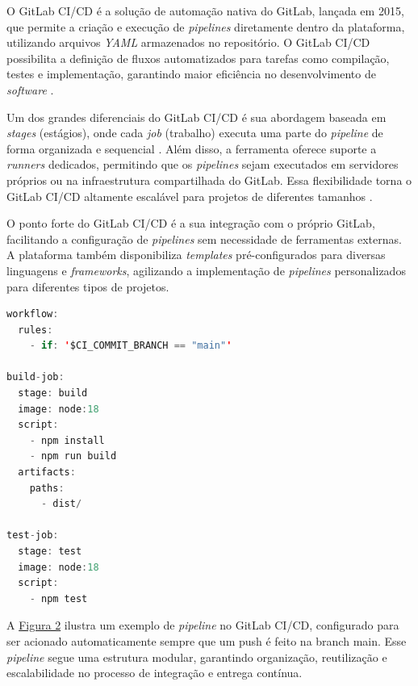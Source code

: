 O GitLab CI/CD é a solução de automação nativa do GitLab, lançada em 2015, que permite a criação e execução de \textit{pipelines} diretamente dentro da plataforma, utilizando arquivos \textit{YAML} armazenados no repositório. O GitLab CI/CD possibilita a definição de fluxos automatizados para tarefas como compilação, testes e implementação, garantindo maior eficiência no desenvolvimento de \textit{software} \cite{GetStartedWithGitLab}.

Um dos grandes diferenciais do GitLab CI/CD é sua abordagem baseada em \textit{stages} (estágios), onde cada \textit{job} (trabalho) executa uma parte do \textit{pipeline} de forma organizada e sequencial \cite{GitlabSteps}. Além disso, a ferramenta oferece suporte a \textit{runners} dedicados, permitindo que os \textit{pipelines} sejam executados em servidores próprios ou na infraestrutura compartilhada do GitLab. Essa flexibilidade torna o GitLab CI/CD altamente escalável para projetos de diferentes tamanhos \cite{GitlabRunners}. 

O ponto forte do GitLab CI/CD é a sua integração com o próprio GitLab, facilitando a configuração de \textit{pipelines} sem necessidade de ferramentas externas. A plataforma também disponibiliza \textit{templates} pré-configurados para diversas linguagens e \textit{frameworks}, agilizando a implementação de \textit{pipelines} personalizados para diferentes tipos de projetos.

\begin{sourcecode}[H]
\caption{\label{codigo:codigoGitlab}Exemplo arquivo de configuração de \textit{pipeline} do GitLab}
\begin{lstlisting}[frame=single, language=Java]
workflow:
  rules:
    - if: '$CI_COMMIT_BRANCH == "main"'

build-job:
  stage: build
  image: node:18
  script:
    - npm install
    - npm run build
  artifacts:
    paths:
      - dist/

test-job:
  stage: test
  image: node:18
  script:
    - npm test
\end{lstlisting}
\fonte{}
\end{sourcecode}

A \hyperref[codigo:codigoGitlab]{Figura 2} ilustra um exemplo de \textit{pipeline} no GitLab CI/CD, configurado para ser acionado automaticamente sempre que um push é feito na branch main. Esse \textit{pipeline} segue uma estrutura modular, garantindo organização, reutilização e escalabilidade no processo de integração e entrega contínua.

